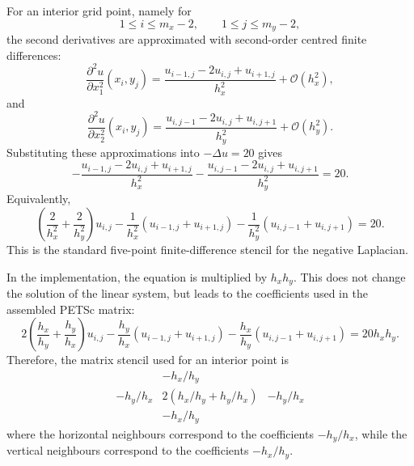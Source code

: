 \documentclass[unicode,10pt,a4paper,oneside,numbers=endperiod,openany]{scrartcl}
\begin{document}
For an interior grid point, namely for
\[
    1 \leq i \leq m_x-2,
    \qquad
    1 \leq j \leq m_y-2,
\]
the second derivatives are approximated with second-order centred finite
differences:
\begin{equation*}
    \frac{\partial^2 u}{\partial x_1^2}(x_i,y_j)
    =
    \frac{u_{i-1,j} - 2u_{i,j} + u_{i+1,j}}{h_x^2}
    +
    \mathcal{O}(h_x^2),
\end{equation*}
and
\begin{equation*}
    \frac{\partial^2 u}{\partial x_2^2}(x_i,y_j)
    =
    \frac{u_{i,j-1} - 2u_{i,j} + u_{i,j+1}}{h_y^2}
    +
    \mathcal{O}(h_y^2).
\end{equation*}
Substituting these approximations into \(-\Delta u = 20\) gives
\begin{equation*}
    -
    \frac{u_{i-1,j} - 2u_{i,j} + u_{i+1,j}}{h_x^2}
    -
    \frac{u_{i,j-1} - 2u_{i,j} + u_{i,j+1}}{h_y^2}
    =
    20.
\end{equation*}
Equivalently,
\begin{equation*}
    \left(\frac{2}{h_x^2}+\frac{2}{h_y^2}\right)u_{i,j}
    -
    \frac{1}{h_x^2}
    \left(u_{i-1,j}+u_{i+1,j}\right)
    -
    \frac{1}{h_y^2}
    \left(u_{i,j-1}+u_{i,j+1}\right)
    =
    20.
\end{equation*}
This is the standard five-point finite-difference stencil for the negative
Laplacian.

In the implementation, the equation is multiplied by \(h_x h_y\). This does not
change the solution of the linear system, but leads to the coefficients used in
the assembled PETSc matrix:
\begin{equation}
    2\left(\frac{h_x}{h_y}+\frac{h_y}{h_x}\right)u_{i,j}
    -
    \frac{h_y}{h_x}
    \left(u_{i-1,j}+u_{i+1,j}\right)
    -
    \frac{h_x}{h_y}
    \left(u_{i,j-1}+u_{i,j+1}\right)
    =
    20 h_x h_y.
\label{eq:fd_scaled_stencil} 
\end{equation}
Therefore, the matrix stencil used for an interior point is
\begin{equation}
\begin{array}{ccc}
        & -h_x/h_y &        \\[2mm]
 -h_y/h_x
        & 2(h_x/h_y+h_y/h_x)
        & -h_y/h_x \\[2mm]
        & -h_x/h_y &
\end{array}
\label{eq:matrix_stencil} 
\end{equation}
where the horizontal neighbours correspond to the coefficients
\(-h_y/h_x\), while the vertical neighbours correspond to the coefficients
\(-h_x/h_y\).
\end{document}
